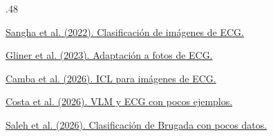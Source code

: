 {\begin{frame}[c]
\begin{columns}[T,onlytextwidth]
\begin{column}{.48\textwidth}
{\href{https://pmc.ncbi.nlm.nih.gov/articles/PMC8948243/}{Sangha et al. (2022). Clasificación de imágenes de ECG.}\par\vspace{2mm}
\href{https://pmc.ncbi.nlm.nih.gov/articles/PMC10462630/}{Gliner et al. (2023). Adaptación a fotos de ECG.}\par\vspace{2mm}
\href{https://portalinvestigacion.uniovi.es/documentos/697e9dda4f95b66d0e7b373a?lang=en}{Camba et al. (2026). ICL para imágenes de ECG.}\par\vspace{2mm}
\href{https://pubmed.ncbi.nlm.nih.gov/42330857/}{Costa et al. (2026). VLM y ECG con pocos ejemplos.}\par\vspace{2mm}
\href{https://doi.org/10.1371/journal.pdig.0001222}{Saleh et al. (2026). Clasificación de Brugada con pocos datos.}\par}
\end{column}
\end{columns}
\end{frame}}

